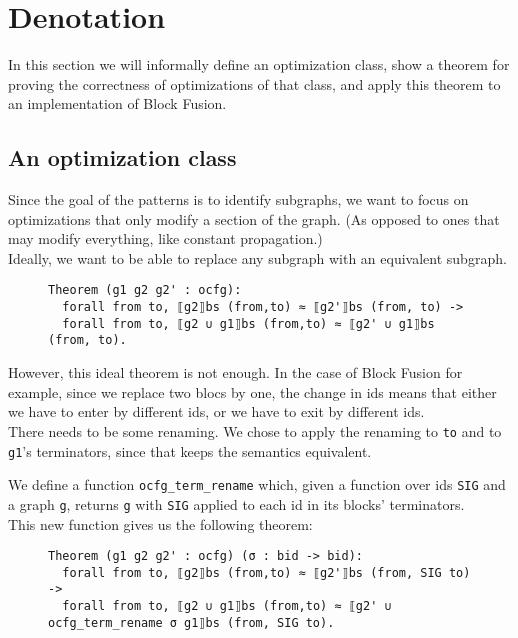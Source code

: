\documentclass[11pt]{article}
\newcommand{\inlinecoq}[1]{\mbox{\lstinline[style=customcoq,columns=fixed,basewidth=.48em]{#1}}}
\newcommand{\ilc}[1]{\inlinecoq{#1}}
\begin{document}
\section{Denotation}
\label{sec:deno}

In this section we will informally define an optimization class, show a theorem for proving the correctness of optimizations of that class, and apply this theorem to an implementation of Block Fusion.

\subsection{An optimization class}

Since the goal of the patterns is to identify subgraphs, we want to focus on optimizations that only modify a section of the graph. (As opposed to ones that may modify everything, like constant propagation.)\\
Ideally, we want to be able to replace any subgraph with an equivalent subgraph.

\begin{figure}[h]
\end{figure}
\begin{figure}[h]
  \begin{lstlisting}[style=customcoq,basicstyle=\small\ttfamily]
Theorem (g1 g2 g2' : ocfg):
  forall from to, ⟦g2⟧bs (from,to) ≈ ⟦g2'⟧bs (from, to) ->
  forall from to, ⟦g2 ∪ g1⟧bs (from,to) ≈ ⟦g2' ∪ g1⟧bs (from, to).
  \end{lstlisting}
\end{figure}

However, this ideal theorem is not enough. In the case of Block Fusion for example, since we replace two blocs by one, the change in ids means that either we have to enter by different ids, or we have to exit by different ids.\\
There needs to be some renaming. We chose to apply the renaming to \ilc{to} and to \ilc{g1}'s terminators, since that keeps the semantics equivalent.

We define a function \ilc{ocfg_term_rename} which, given a function over ids \ilc{SIG} and a graph \ilc{g}, returns \ilc{g} with \ilc{SIG} applied to each id in its blocks' terminators.\\
This new function gives us the following theorem:
\begin{figure}[h]
  \begin{lstlisting}[style=customcoq,basicstyle=\small\ttfamily]
Theorem (g1 g2 g2' : ocfg) (σ : bid -> bid):
  forall from to, ⟦g2⟧bs (from,to) ≈ ⟦g2'⟧bs (from, SIG to) ->
  forall from to, ⟦g2 ∪ g1⟧bs (from,to) ≈ ⟦g2' ∪ ocfg_term_rename σ g1⟧bs (from, SIG to).
  \end{lstlisting}
\end{figure}
\end{document}
